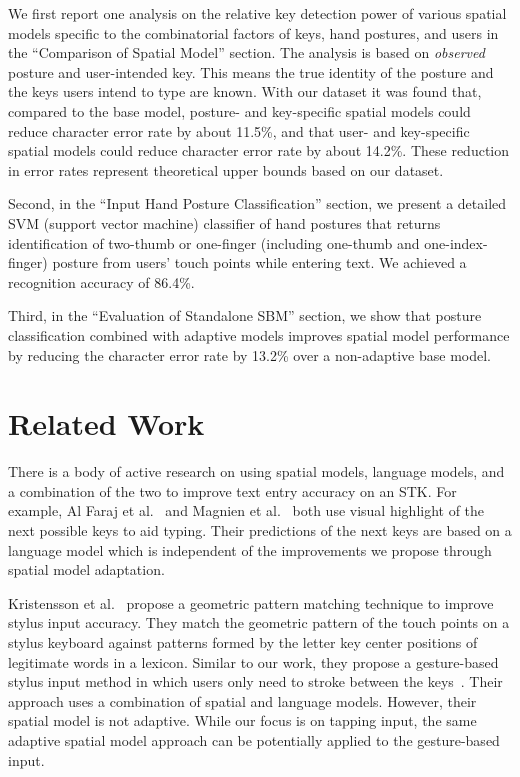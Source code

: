 \documentclass{sigchi}
\begin{document}
We first report one analysis on the 
relative key detection power of various spatial models specific to the 
combinatorial factors of keys, hand postures, and users in the ``Comparison of
Spatial Model'' section. The analysis is based on \textit{observed} posture and
user-intended key. This means the true
identity of the posture and the keys users intend to type are
known.
With our dataset it was found that, compared to
the base model, posture- and key-specific spatial models could reduce character
error rate by about 11.5\%, and that user- and key-specific spatial models could
reduce character error rate by about 14.2\%. These reduction in error rates
represent theoretical upper bounds based on our dataset.

Second, in the ``Input Hand Posture Classification'' section, we present a detailed 
SVM (support vector machine) classifier of hand postures that returns identification of 
two-thumb or one-finger (including one-thumb and one-index-finger) posture from 
users' touch points while entering text. We achieved a recognition accuracy of
86.4\%.

Third, in the ``Evaluation of Standalone SBM'' section, we show that posture classification combined with adaptive models improves spatial model performance by reducing the character error rate by 13.2\% over a non-adaptive base model.

\section{Related Work}

There is a body of active research on using spatial models, language models, and a combination
of the two to improve text entry accuracy on an STK. For example, 
Al Faraj et al.~\cite{AlFaraj:2009} and Magnien et al.~\cite{Magnien:2004} both use
visual highlight of the next possible keys to aid typing. Their predictions of the next keys are based on a language model which is independent of the improvements we propose through spatial model adaptation.

Kristensson et al.~\cite{Kristensson:2005} propose a geometric pattern matching technique to improve 
stylus input accuracy. They match the geometric pattern of the touch points on a stylus keyboard against patterns formed by 
the letter key center positions of legitimate words in a lexicon. Similar to our work,
they propose a gesture-based stylus input method in which users only need to stroke between the keys~\cite{Kristensson:2004}.
Their approach uses a combination of spatial and language models. However, 
their spatial model is not adaptive. While our focus is on tapping input, the same adaptive spatial model approach
can be potentially applied to the gesture-based input.
\end{document}
